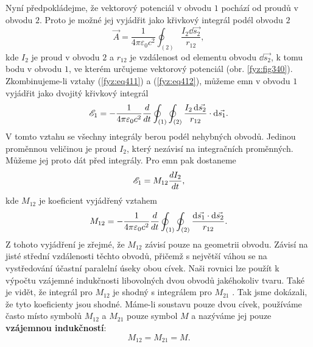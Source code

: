   Nyní předpokládejme, že vektorový potenciál v obvodu \(1\) pochází od proudů v obvodu \(2\). 
  Proto je možné jej vyjádřit jako křivkový integrál podél obvodu \(2\)
  \begin{equation}\label{fyz:eq412}
    \vec{A} = \frac{1}{4\pi\varepsilon_0c^2}\oint_{(2)}\frac{I_2\dd{\vec{s_2}}}{r_{12}},
  \end{equation}
  kde \(I_2\) je proud v obvodu \(2\) a \(r_{12}\) je vzdálenost od elementu obvodu 
  \(\dd\vec{s_2}\), k tomu bodu v obvodu \(1\), ve kterém určujeme vektorový potenciál (obr. 
  \ref{fyz:fig340}). Zkombinujeme-li vztahy (\ref{fyz:eq411}) a (\ref{fyz:eq412}), můžeme emn v 
  obvodu \(1\) vyjádřit jako dvojitý křivkový integrál
  \begin{equation}\label{fyz:eq413}
    \mathscr{E}_1 = - \frac{1}{4\pi\varepsilon_0c^2}\dfrac{d  }{d t}
                    \oint_{(1)}\oint_{(2)}\frac{I_2\mathop{}\!\mathrm{d}\vec{s_2}}{r_{12}}\cdot\mathop{}\!\mathrm{d}\vec{s_1}.
  \end{equation}
  V tomto vztahu se všechny integrály berou podél nehybných obvodů. Jedinou proměnnou veličinou je 
  proud \(I_2\), který nezávisí na integračních proměnných. Můžeme jej proto dát před
  integrály. Pro emn pak dostaneme 
  \begin{equation*}
    \mathscr{E}_1 = M_{12}\dfrac{d I_2}{d t},
  \end{equation*}
  kde \(M_{12}\) je koeficient vyjádřený vztahem
  \begin{equation}\label{fyz:eq414}
    M_{12} = - \frac{1}{4\pi\varepsilon_0c^2}\dfrac{d  }{d t}
             \oint_{(1)}\oint_{(2)}\frac{\mathop{}\!\mathrm{d}\vec{s_1}\cdot\mathop{}\!\mathrm{d}\vec{s_2}}{r_{12}}.
  \end{equation}
  Z tohoto vyjádření je zřejmé, že \(M_{12}\)  závisí pouze na geometrii obvodu. Závisí na jisté 
  střední vzdálenosti těchto obvodů, přičemž s největší váhou se na vystředování účastní paralelní 
  úseky obou cívek. Naši rovnici lze použít k výpočtu vzájemné indukčnosti libovolných dvou obvodů
  jakéhokoliv tvaru. Také je vidět, že integrál pro \(M_{12}\)  je shodný s integrálem pro 
  \(M_{21}\) . Tak jsme dokázali, že tyto koeficienty jsou shodné. Máme-li soustavu pouze dvou 
  cívek, používáme často místo symbolů \(M_{12}\) a \(M_{21}\)  pouze symbol \(M\) a nazýváme jej 
  pouze \textbf{vzájemnou indukčností}:
  \begin{equation*}
    M_{12} =  M_{21} = M.
  \end{equation*}
  
